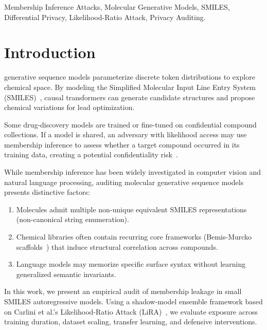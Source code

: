 \documentclass[10pt,journal,compsoc]{IEEEtran}
\begin{document}
{\begin{IEEEkeywords}
Membership Inference Attacks, Molecular Generative Models, SMILES, Differential Privacy, Likelihood-Ratio Attack, Privacy Auditing.
\end{IEEEkeywords}}

\maketitle
\IEEEdisplaynontitleabstractindextext
\IEEEpeerreviewmaketitle

\section{Introduction}
 generative sequence models parameterize discrete token distributions to explore chemical space. By modeling the Simplified Molecular Input Line Entry System (SMILES)~\cite{weininger1988smiles}, causal transformers can generate candidate structures and propose chemical variations for lead optimization.

Some drug-discovery models are trained or fine-tuned on confidential compound collections. If a model is shared, an adversary with likelihood access may use membership inference to assess whether a target compound occurred in its training data, creating a potential confidentiality risk~\cite{kruger2025publishing,shokri2017membership}.

While membership inference has been widely investigated in computer vision and natural language processing, auditing molecular generative sequence models presents distinctive factors:
\begin{enumerate}
    \item Molecules admit multiple non-unique equivalent SMILES representations (non-canonical string enumeration).
    \item Chemical libraries often contain recurring core frameworks (Bemis-Murcko scaffolds~\cite{bemis1996properties}) that induce structural correlation across compounds.
    \item Language models may memorize specific surface syntax without learning generalized semantic invariants.
\end{enumerate}

In this work, we present an empirical audit of membership leakage in small SMILES autoregressive models. Using a shadow-model ensemble framework based on Carlini et al.'s Likelihood-Ratio Attack (LiRA)~\cite{carlini2022membership}, we evaluate exposure across training duration, dataset scaling, transfer learning, and defensive interventions.
\end{document}
